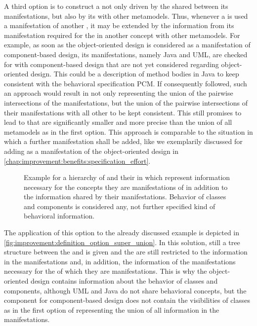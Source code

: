 A third option is to construct a \conceptmetamodel not only driven by the \commonalities shared between its manifestations, but also by its \commonalities with other metamodels.
Thus, whenever a \conceptmetamodel is used a manifestation of another \conceptmetamodel, it may be extended by the information from its manifestation required for the \commonalities in another concept with other metamodels.
For example, as soon as the object-oriented design \conceptmetamodel is considered as a manifestation of component-based design, its manifestations, namely Java and \gls{UML}, are checked for \commonalities with component-based design that are not yet considered \commonalities regarding object-oriented design.
This could be a description of method bodies in Java to keep consistent with the behavioral specification \gls{PCM}.
If consequently followed, such an approach would result in \conceptmetamodels not only representing the union of the pairwise intersections of the manifestations, but the union of the pairwise intersections of their manifestations with all other \concretemetamodels to be kept consistent.
This still promises to lead to \conceptmetamodels that are significantly smaller and more precise than the union of all metamodels as in the first option.
This approach is comparable to the situation in which a further manifestation shall be added, like we exemplarily discussed for adding \cplusplus as a manifestation of the object-oriented design \conceptmetamodel in \autoref{chap:improvement:benefits:specification_effort}.

\begin{figure}
    \centering
    
    \caption[\Commonalities including information of their concepts]{Example for a hierarchy of \conceptmetamodels and their \commonalities in which \commonalities represent information necessary for the concepts they are manifestations of in addition to the information shared by their manifestations. Behavior of classes and components is considered any, not further specified kind of behavioral information.}
    \label{fig:improvement:definition_option_super_union}
\end{figure}

The application of this option to the already discussed example is depicted in \autoref{fig:improvement:definition_option_super_union}.
In this solution, still a tree structure between the \metaclasses and \commonalities is given and the \conceptmetamodel are still restricted to the information in the manifestations and, in addition, the information of the manifestations necessary for the \conceptmetamodels of which they are manifestations.
This is why the object-oriented design \conceptmetamodel contains information about the behavior of classes and components, although \gls{UML} and Java do not share behavioral concepts, but the component \commonality for component-based design does not contain the visibilities of classes as in the first option of representing the union of all information in the manifestations.

